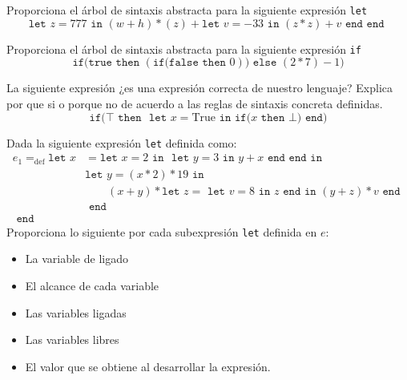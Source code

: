 \bigskip
    \begin{exercise}
        Proporciona el árbol de sintaxis abstracta para la siguiente expresión \texttt{let}
        \[ 
            \texttt{let } z = 777 \texttt{ in } (w + h) * (z) + \texttt{let } v = -33 \texttt{ in } (z * z) + v \texttt{ end } \texttt{end } 
        \]
    \end{exercise}

    \bigskip
    
    \begin{exercise}
        Proporciona el árbol de sintaxis abstracta para la siguiente expresión \texttt{if}
        \[
            \texttt{if(} \texttt{true} \texttt{ then } (\texttt{if(}  \texttt{false} \texttt{ then } 0)) \texttt{ else } (2 * 7) - 1 \texttt{)}
        \]
    \end{exercise}

    \bigskip
    
    \begin{exercise}
        La siguiente expresión ¿es una expresión correcta de nuestro lenguaje? Explica por que si o porque no de acuerdo a las reglas de sintaxis concreta definidas.
        \[
            \texttt{if(} \top \texttt{ then } \texttt{ let } x = \text{True} \texttt{ in} \texttt{ if(} x \texttt{ then } \bot \texttt{)} \texttt{ end} \text{)}
        \]
    \end{exercise}

    \bigskip
    
    \begin{exercise}
        Dada la siguiente expresión \texttt{let} definida como:
        \begin{align*}
        	e_1=_{\text{def}}\texttt{let  }
        		x&= \texttt{let }x = 2 \texttt{ in } \texttt{ let } y = 3 \texttt{ in } y + x \texttt{ end } \texttt{end}
        		\texttt{ in }\\
        		 &\texttt{let }y=(x \ast 2) \ast 19 
        		 	\texttt{ in } \\
        		 & \qquad(x + y) \ast \texttt{let } z = \texttt{ let } v = 8 \texttt{ in } z \texttt{ end} \texttt{ in } 
        		 						(y + z) \ast v 
        		 				\texttt{ end }\\
        		 &\texttt{ end }\\
        	\texttt{ end }&
        \end{align*}
        Proporciona lo siguiente por cada subexpresión \texttt{let} definida en $e$:
        \begin{itemize}
	 \item La variable de ligado
            \item El alcance de cada variable
            \item Las variables ligadas
	 \item Las variables libres
            \item El valor que se obtiene al desarrollar la expresión.
        \end{itemize}
    \end{exercise}

